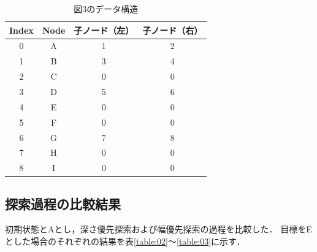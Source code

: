 \documentclass[12pt,dvipdfmx]{jarticle}
\begin{document}
	\begin{table}
		\centering
		\caption{図3のデータ構造}
		\label{table:01}
		\begin{tabular}{|c|c|c|c|}
		\hline
		Index & Node & 子ノード（左） &子ノード（右）  \\ \hline
		0 & A & 1 & 2 \\
		1 & B & 3 & 4 \\
		2 & C & 0 & 0 \\
		3 & D & 5 & 6 \\
		4 & E & 0 & 0 \\
		5 & F & 0 & 0 \\
		6 & G & 7 & 8 \\
		7 & H & 0 & 0 \\
		8 & I & 0 & 0 \\
		\hline
		\end{tabular}
	\end{table}


\subsection*{ 探索過程の比較結果}
初期状態とAとし，深さ優先探索および幅優先探索の過程を比較した．
目標をEとした場合のそれぞれの結果を表\ref{table:02}～\ref{table:03}に示す．
\end{document}
